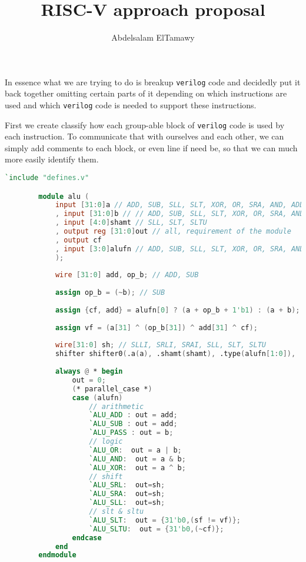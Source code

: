 \documentclass[]{article}
\title{RISC-V approach proposal}
\author{Abdelsalam ElTamawy}
\begin{document}

	In essence what we are trying to do is breakup \verb|verilog| code and decidedly put it back together omitting certain parts of it depending on which instructions are used and which \verb|verilog| code is needed to support these instructions.

	First we create classify how each group-able block of \verb|verilog| code is used by each instruction. To communicate that with ourselves and each other, we can simply add comments to each block, or even line if need be, so that we can much more easily identify them.

	\begin{lstlisting}[language=verilog, caption=an example of an annotated file]
		`include "defines.v"

		module alu (
			input [31:0]a // ADD, SUB, SLL, SLT, XOR, OR, SRA, AND, ADDI, SLTI, SLTIU, XORI, ORI, ANDI, SLLI, SRLI, SRLI, SRAI
			, input [31:0]b // // ADD, SUB, SLL, SLT, XOR, OR, SRA, AND, ADDI, SLTI, SLTIU, XORI, ORI, ANDI, SLLI, SRLI, SRLI, SRAI
			, input [4:0]shamt // SLL, SLT, SLTU
			, output reg [31:0]out // all, requirement of the module
			, output cf 
			, input [3:0]alufn // ADD, SUB, SLL, SLT, XOR, OR, SRA, AND, ADDI, SLTI, SLTIU, XORI, ORI, ANDI, SLLI, SRLI, SRLI, SRAI
			);
		
			wire [31:0] add, op_b; // ADD, SUB
			
			assign op_b = (~b); // SUB
			
			assign {cf, add} = alufn[0] ? (a + op_b + 1'b1) : (a + b); // ADD, SUB
			
			assign vf = (a[31] ^ (op_b[31]) ^ add[31] ^ cf);
			
			wire[31:0] sh; // SLLI, SRLI, SRAI, SLL, SLT, SLTU
			shifter shifter0(.a(a), .shamt(shamt), .type(alufn[1:0]),  .r(sh)); // SLLI, SRLI, SRAI, SLL, SLT, SLTU
			
			always @ * begin
				out = 0;
				(* parallel_case *)
				case (alufn)
					// arithmetic
					`ALU_ADD : out = add;
					`ALU_SUB : out = add;
					`ALU_PASS : out = b;
					// logic
					`ALU_OR:  out = a | b;
					`ALU_AND:  out = a & b;
					`ALU_XOR:  out = a ^ b;
					// shift
					`ALU_SRL:  out=sh;
					`ALU_SRA:  out=sh;
					`ALU_SLL:  out=sh;
					// slt & sltu
					`ALU_SLT:  out = {31'b0,(sf != vf)};
					`ALU_SLTU:  out = {31'b0,(~cf)};
				endcase
			end
		endmodule
	\end{lstlisting}
\end{document}
